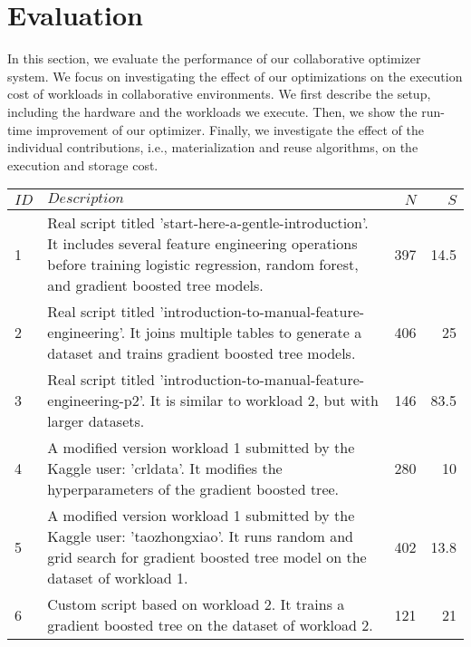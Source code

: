 \section{Evaluation} \label{sec-evaluation} 
In this section, we evaluate the performance of our collaborative optimizer system.
We focus on investigating the effect of our optimizations on the execution cost of workloads in collaborative environments.
We first describe the setup, including the hardware and the workloads we execute.
Then, we show the run-time improvement of our optimizer.
Finally, we investigate the effect of the individual contributions, i.e., materialization and reuse algorithms, on the execution and storage cost.
\begin{table*}[t]
\begin{tabular}{lp{}rr}
\hline
\textbf{$ID$} & \textbf{$Description$}& \textbf{$N$}& \textbf{$S$}   \\
\hline
1 &  \parbox[t]{0.84\textwidth}{\linespread{0.5}\selectfont \small Real script titled 'start-here-a-gentle-introduction'. It includes several feature engineering operations before training logistic regression, random forest, and gradient boosted tree models.} & 397 & 14.5\\[0.4cm]

2 &   \parbox[t]{0.84\textwidth}{\linespread{0.5}\selectfont \small Real script titled 'introduction-to-manual-feature-engineering'. It joins multiple tables to generate a dataset and trains gradient boosted tree models.} & 406 & 25\\[0.4cm]

3 &   \parbox[t]{0.84\textwidth}{\linespread{0.5}\selectfont \small Real script titled 'introduction-to-manual-feature-engineering-p2'. It is similar to workload 2, but with larger datasets.} & 146 & 83.5\\[0.15cm]

4 & \parbox[t]{0.84\textwidth}{\linespread{0.5}\selectfont \small A modified version workload 1 submitted by the Kaggle user: 'crldata'. It modifies the hyperparameters of the gradient boosted tree.} & 280 & 10\\[0.4cm]

5 & \parbox[t]{0.84\textwidth}{\linespread{0.5}\selectfont \small A modified version workload 1 submitted by the Kaggle user: 'taozhongxiao'. It runs random and grid search for gradient boosted tree model on the dataset of workload 1.} & 402 & 13.8\\[0.4cm]

6 & \parbox[t]{0.84\textwidth}{\linespread{0.5}\selectfont \small Custom script based on workload 2. It trains a gradient boosted tree on the dataset of workload 2.} & 121 & 21\\[0.15cm]


\end{tabular}
\end{table*}
